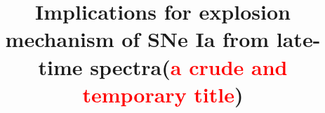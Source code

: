 \documentclass[twocolumn]{aastex631}
\begin{document}
\title{Implications for explosion mechanism of SNe Ia from late-time spectra(\textcolor{red}{a crude and temporary title})}


\end{document}
